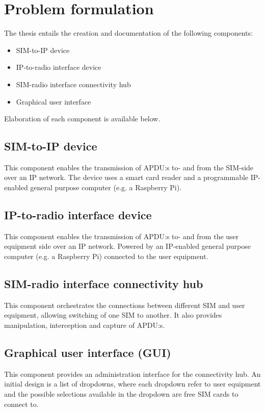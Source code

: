 \documentclass[12pt]{article}
\begin{document}
\section*{Problem formulation}

The thesis entails the creation and documentation of the following
components:
\begin{itemize}
    \item SIM-to-IP device
    \item IP-to-radio interface device
    \item SIM-radio interface connectivity hub
    \item Graphical user interface
\end{itemize}
Elaboration of each component is available below.

\subsection*{SIM-to-IP device}
This component enables the transmission of APDU:s to- and from
the SIM-side over an IP network. The device uses a smart card
reader and a programmable IP-enabled general purpose computer
(e.g. a Raspberry Pi).

\subsection*{IP-to-radio interface device}
This component enables the transmission of APDU:s to- and from
the user equipment side over an IP network. Powered by an
IP-enabled general purpose computer (e.g. a Raspberry Pi)
connected to the user equipment.

\subsection*{SIM-radio interface connectivity hub}
This component orchestrates the connections between different SIM
and user equipment, allowing switching of one SIM to another. It
also provides manipulation, interception and capture of APDU:s.

\subsection*{Graphical user interface (GUI)}
This component provides an administration interface for the
connectivity hub. An initial design is a list of dropdowns, where
each dropdown refer to user equipment and the possible selections
available in the dropdown are free SIM cards to connect to.
\end{document}
